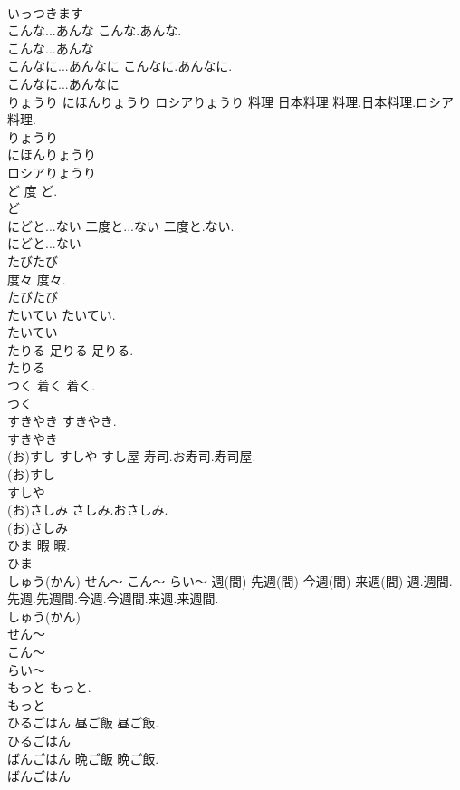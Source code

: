 \documentclass[8pt]{extreport}
\begin{document}
\begin{CJK}{UTF8}{min}
\\	いっつきます
\\	こんな...あんな		こんな.あんな.	
\\	こんな...あんな
\\	こんなに...あんなに		こんなに.あんなに.	
\\	こんなに...あんなに
\\	りょうり にほんりょうり ロシアりょうり	料理 日本料理	料理.日本料理.ロシア料理.	
\\	りょうり
\\	にほんりょうり
\\	ロシアりょうり
\\	ど	度	ど.	
\\	ど
\\	にどと...ない	二度と...ない	二度と.ない.	
\\	にどと...ない
\\	たびたび	
\\	度々	度々.	
\\	たびたび
\\	たいてい		たいてい.	
\\	たいてい
\\	たりる	足りる	足りる.	
\\	たりる
\\	つく	着く	着く.	
\\	つく
\\	すきやき		すきやき.	
\\	すきやき
\\	(お)すし すしや	すし屋	寿司.お寿司.寿司屋.	
\\	(お)すし
\\	すしや
\\	(お)さしみ		さしみ.おさしみ.	
\\	(お)さしみ
\\	ひま	暇	暇.	
\\	ひま
\\	しゅう(かん) せん～ こん～ らい～	週(間) 先週(間) 今週(間) 来週(間)	週.週間.先週.先週間.今週.今週間.来週.来週間.	
\\	しゅう(かん)
\\	せん～
\\	こん～
\\	らい～
\\	もっと		もっと.	
\\	もっと
\\	ひるごはん	昼ご飯	昼ご飯.	
\\	ひるごはん
\\	ばんごはん	晩ご飯	晩ご飯.	
\\	ばんごはん

\end{CJK}
\end{document}
